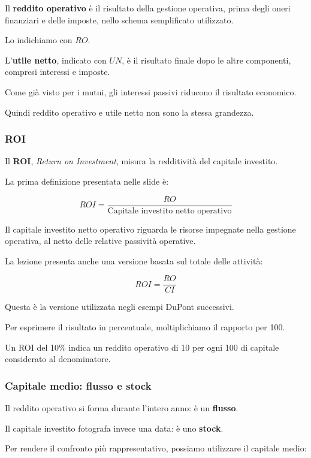 \noindent Il \textbf{reddito operativo}
è il risultato della gestione operativa,
prima degli oneri finanziari
e delle imposte,
nello schema semplificato utilizzato.

\noindent Lo indichiamo con $RO$.

\noindent L'\textbf{utile netto},
indicato con $UN$,
è il risultato finale
dopo le altre componenti,
compresi interessi e imposte.

\noindent Come già visto per i mutui,
gli interessi passivi
riducono il risultato economico.

\noindent Quindi reddito operativo
e utile netto
non sono la stessa grandezza.


\subsubsection*{ROI}

\noindent Il \textbf{ROI},
\textit{Return on Investment},
misura la redditività
del capitale investito.

\noindent La prima definizione
presentata nelle slide è:

\[
\boxed{
ROI=
\frac{RO}
{\text{Capitale investito netto operativo}}
}
\]

\noindent Il capitale investito netto operativo
riguarda le risorse impegnate
nella gestione operativa,
al netto delle relative passività operative.

\noindent La lezione presenta anche
una versione basata
sul totale delle attività:

\[
\boxed{
ROI=\frac{RO}{CI}
}
\]

\noindent Questa è la versione
utilizzata negli esempi DuPont successivi.

\noindent Per esprimere il risultato
in percentuale,
moltiplichiamo il rapporto per 100.

\noindent Un ROI del 10\%
indica un reddito operativo di 10
per ogni 100 di capitale
considerato al denominatore.


\subsubsection*{Capitale medio: flusso e stock}

\noindent Il reddito operativo
si forma durante l'intero anno:
è un \textbf{flusso}.

\noindent Il capitale investito
fotografa invece una data:
è uno \textbf{stock}.

\noindent Per rendere il confronto
più rappresentativo,
possiamo utilizzare il capitale medio:

